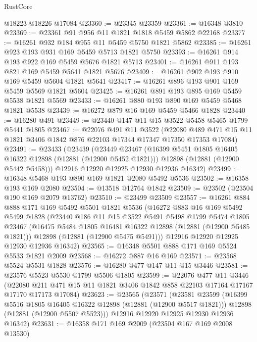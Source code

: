 \begin{lexlean}{RustCore}
\begin{coremodule}
    @18223
    @18226
    @17084
@23360 := @23345 @23359
@23361 := @16348 @3810
@23369 := @23361 @91 @956 @11 @1821 @1818 @5459 @5862 @22168
@23377 := @16261 @932 @184 @955 @11 @5459 @5750 @1821 @5862
@23385 := @16261 @923 @193 @931 @169 @5459 @5713 @1821 @5750
@23393 := @16261 @914 @193 @922 @169 @5459 @5676 @1821 @5713
@23401 := @16261 @911 @193 @821 @169 @5459 @5641 @1821 @5676
@23409 := @16261 @902 @193 @910 @169 @5459 @5604 @1821 @5641
@23417 := @16261 @896 @193 @901 @169 @5459 @5569 @1821 @5604
@23425 := @16261 @891 @193 @895 @169 @5459 @5538 @1821 @5569
@23433 := @16261 @880 @193 @890 @169 @5459 @5468 @1821 @5538
@23439 := @16272 @879 @16 @169 @5459 @5466 @1828
@23440 := @16280 @491
@23449 := @23440 @147 @11 @15 @3522 @5458 @5465 @1799 @5441 @1805
@23467 := @22076
    @491
    @11
    @3522
    (@22080 @489 @471 @15 @11 @1821 @3406 @1842 @876 @22103 @17344 @17347 @17350 @17353 @17084)
@23491 := @23433
    (@23439
      (@23449
        @23467
        (@16399 @5451 @1805 @16405 @16322 @12898 (@12881 (@12900 @5452 @1821)))
        @12898
        (@12881 (@12900 @5442 @5458)))
      @12916
      @12920
      @12925
      @12930
      @12936
      @16342)
@23499 := @16348 @5468 @193 @890 @169 @1821 @2080 @5492 @5536
@23502 := @16358 @193 @169 @2080
@23504 := @13518 @12764 @1842
@23509 := @23502 (@23504 @190 @169 @2079 @13762)
@23510 := @23499 @23509
@23557 := @16261
    @884
    @888
    @171
    @169
    @5492
    @5501
    @1821
    @5536
    (@16272
      @883
      @16
      @169
      @5492
      @5499
      @1828
      (@23440
        @186
        @11
        @15
        @3522
        @5491
        @5498
        @1799
        @5474
        @1805
        @23467
        (@16475 @5484 @1805 @16481 @16322 @12898 (@12881 (@12900 @5485 @1821)))
        @12898
        (@12881 (@12900 @5475 @5491)))
      @12916
      @12920
      @12925
      @12930
      @12936
      @16342)
@23565 := @16348 @5501 @888 @171 @169 @5524 @5533 @1821 @2009
@23568 := @16272 @887 @16 @169
@23571 := @23568 @5524 @5531 @1828
@23576 := @16280 @477 @147 @11 @15 @3446
@23581 := @23576 @5523 @5530 @1799 @5506 @1805
@23599 := @22076
    @477
    @11
    @3446
    (@22080 @211 @471 @15 @11 @1821 @3406 @1842 @858 @22103 @17164 @17167 @17170 @17173 @17084)
@23623 := @23565
    (@23571
      (@23581
        @23599
        (@16399 @5516 @1805 @16405 @16322 @12898 (@12881 (@12900 @5517 @1821)))
        @12898
        (@12881 (@12900 @5507 @5523)))
      @12916
      @12920
      @12925
      @12930
      @12936
      @16342)
@23631 := @16358 @171 @169 @2009 (@23504 @167 @169 @2008 @13530)

\end{coremodule}
\end{lexlean}
